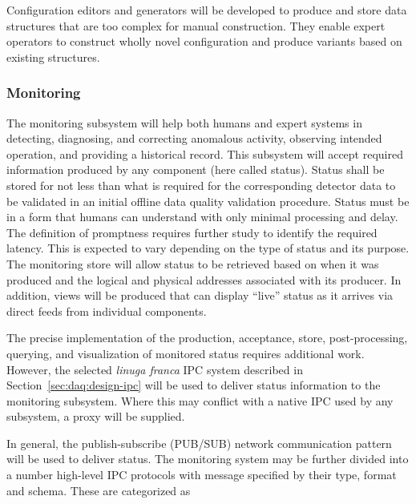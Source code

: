Configuration editors and generators will be developed to produce and store data structures that are too complex for manual construction. 
They enable expert operators to construct wholly novel configuration and produce variants based on existing structures.

\subsubsection{Monitoring}
\label{sec:daq:design:ccm:monitoring}

The  monitoring subsystem will help both humans and expert systems in detecting, diagnosing, and correcting anomalous activity, observing intended operation, and providing a historical record.
This subsystem will accept required information produced by any  component (here called status).
Status shall be stored for not less than what is required for the corresponding detector data to be validated in an initial offline data quality validation procedure.
Status must be in a form that humans can understand with only minimal processing and delay. 
The definition of promptness requires further study to identify the required latency. This is expected to vary depending on the type of status and its purpose.  
The monitoring store will allow status to be retrieved based on when it was produced and the logical and physical addresses associated with its producer.
In addition, views will be produced that can display ``live'' status as it arrives via direct feeds from individual components.

The precise implementation of the production, acceptance, store, post-processing, querying, and visualization of monitored status requires additional work. 
However, the selected \textit{linuga franca} IPC system described in Section~\ref{sec:daq:design-ipc} will be used to deliver status information to the monitoring subsystem. 
Where this may conflict with a native IPC used by any subsystem, a proxy will be supplied. 

In general, the publish-subscribe (PUB/SUB) network communication pattern will be used to deliver status. 
The monitoring system may be further divided into a number high-level IPC protocols with message specified by their type, format and schema.
These are categorized as


